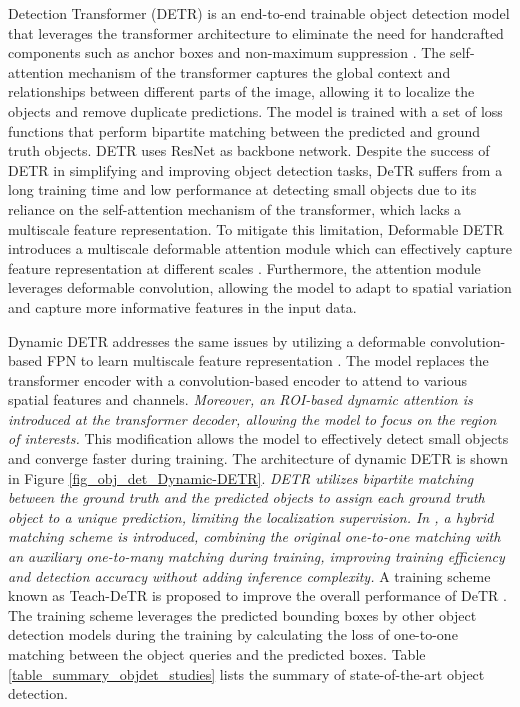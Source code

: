 \documentclass[preprint,12pt]{elsarticle}
\begin{document}
Detection Transformer (DETR) is an end-to-end trainable object detection model that leverages the transformer architecture to eliminate the need for handcrafted components such as anchor boxes and non-maximum suppression \citep{carion_end_end_2020}. The self-attention mechanism of the transformer captures the global context and relationships between different parts of the image, allowing it to localize the objects and remove duplicate predictions. The model is trained with a set of loss functions that perform bipartite matching between the predicted and ground truth objects. DETR uses ResNet as backbone network. Despite the success of DETR in simplifying and improving object detection tasks, DeTR suffers from a long training time and low performance at detecting small objects due to its reliance on the self-attention mechanism of the transformer, which lacks a multiscale feature representation. To mitigate this limitation, Deformable DETR introduces a multiscale deformable attention module which can effectively capture feature representation at different scales \citep{zhu_deformable_2020}. Furthermore, the attention module leverages deformable convolution, allowing the model to adapt to spatial variation and capture more informative features in the input data. 

Dynamic DETR addresses the same issues by utilizing a deformable convolution-based FPN to learn multiscale feature representation \citep{dai_dynamic_2021}. The model replaces the transformer encoder with a convolution-based encoder to attend to various spatial features and channels. \emph{Moreover, an ROI-based dynamic attention is introduced at the transformer decoder, allowing the model to focus on the region of interests.} This modification allows the model to effectively detect small objects and converge faster during training. The architecture of dynamic DETR is shown in Figure \ref{fig_obj_det_Dynamic-DETR}. \emph{DETR utilizes bipartite matching between the ground truth and the predicted objects to assign each ground truth object to a unique prediction, limiting the localization supervision. In \citep{jia_detrs_2023}, a hybrid matching scheme is introduced, combining the original one-to-one matching with an auxiliary one-to-many matching during training, improving training efficiency and detection accuracy without adding inference complexity.} A training scheme known as Teach-DeTR is proposed to improve the overall performance of DeTR \citep{huang_teach-detr_2023}. The training scheme leverages the predicted bounding boxes by other object detection models during the training by calculating the loss of one-to-one matching between the object queries and the predicted boxes. Table \ref{table_summary_objdet_studies} lists the summary of state-of-the-art object detection.
\end{document}
